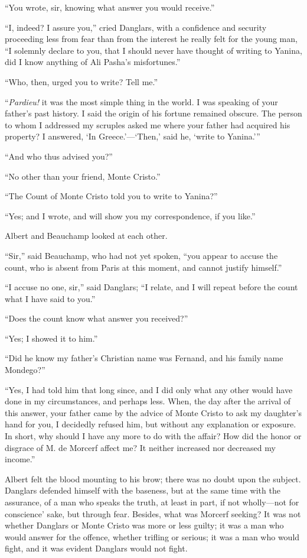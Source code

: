 “You wrote, sir, knowing what answer you would receive.”

“I, indeed? I assure you,” cried Danglars, with a confidence and
security proceeding less from fear than from the interest he really
felt for the young man, “I solemnly declare to you, that I should never
have thought of writing to Yanina, did I know anything of Ali Pasha’s
misfortunes.”

“Who, then, urged you to write? Tell me.”

“\textit{Pardieu!} it was the most simple thing in the world. I was speaking
of your father’s past history. I said the origin of his fortune
remained obscure. The person to whom I addressed my scruples asked me
where your father had acquired his property? I answered, ‘In
Greece.’—‘Then,’ said he, ‘write to Yanina.’”

“And who thus advised you?”

“No other than your friend, Monte Cristo.”

“The Count of Monte Cristo told you to write to Yanina?”

“Yes; and I wrote, and will show you my correspondence, if you like.”

Albert and Beauchamp looked at each other.

“Sir,” said Beauchamp, who had not yet spoken, “you appear to accuse
the count, who is absent from Paris at this moment, and cannot justify
himself.”

“I accuse no one, sir,” said Danglars; “I relate, and I will repeat
before the count what I have said to you.”

“Does the count know what answer you received?”

“Yes; I showed it to him.”

“Did he know my father’s Christian name was Fernand, and his family
name Mondego?”

“Yes, I had told him that long since, and I did only what any other
would have done in my circumstances, and perhaps less. When, the day
after the arrival of this answer, your father came by the advice of
Monte Cristo to ask my daughter’s hand for you, I decidedly refused
him, but without any explanation or exposure. In short, why should I
have any more to do with the affair? How did the honor or disgrace of
M. de Morcerf affect me? It neither increased nor decreased my income.”

Albert felt the blood mounting to his brow; there was no doubt upon the
subject. Danglars defended himself with the baseness, but at the same
time with the assurance, of a man who speaks the truth, at least in
part, if not wholly—not for conscience’ sake, but through fear.
Besides, what was Morcerf seeking? It was not whether Danglars or Monte
Cristo was more or less guilty; it was a man who would answer for the
offence, whether trifling or serious; it was a man who would fight, and
it was evident Danglars would not fight.

